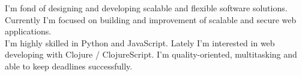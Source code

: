 \documentclass[9pt]{developercv} %
\begin{document}
\vspace{0.5cm}



\begin{minipage}[t]{0.4\textwidth} %
	\vspace{-\baselineskip} %
	
	I'm fond of designing and developing scalable and flexible software solutions. Currently I'm focused on building and improvement of scalable and secure web applications.\\ I'm highly skilled in Python and JavaScript. Lately I'm interested in web developing with Clojure / ClojureScript. I'm quality-oriented, multitasking and able to keep deadlines successfully. %
\end{minipage}
\hfill %
\begin{minipage}[t]{0.5\textwidth} %
	\vspace{-\baselineskip} %
	\begin{barchart}{5.5}
	\end{barchart}
\end{minipage}

\begin{center}
\end{center}


\end{document}
